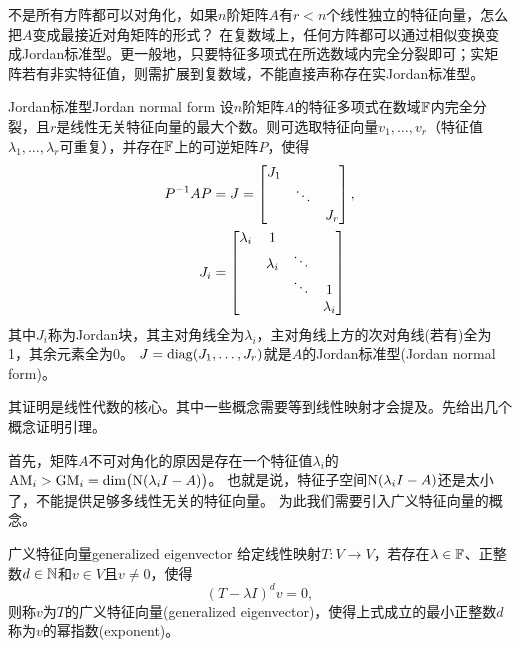 
不是所有方阵都可以对角化，如果$n$阶矩阵$A$有$r < n$个线性独立的特征向量，怎么把$A$变成最接近对角矩阵的形式？
在复数域上，任何方阵都可以通过相似变换变成Jordan标准型。更一般地，只要特征多项式在所选数域内完全分裂即可；实矩阵若有非实特征值，则需扩展到复数域，不能直接声称存在实Jordan标准型。

\begin{theorem}{Jordan标准型}{Jordan normal form}
	设$n$阶矩阵$A$的特征多项式在数域$\mathbb{F}$内完全分裂，且$r$是线性无关特征向量的最大个数。则可选取特征向量$v_1,\ldots,v_r$（特征值$\lambda_1,\ldots,\lambda_r$可重复），并存在$\mathbb{F}$上的可逆矩阵$P$，使得
	\begin{subequations}\label{eq:la-jordan-normal-form}
		\begin{align}
			P^{-1} AP &= J = \begin{bmatrix}
				J_1             \\
				 & \ddots       \\
				 &        & J_r
			\end{bmatrix},\\
			J_i &= \begin{bmatrix}
				\lambda_i & 1                              \\
				          & \lambda_i & \ddots             \\
				          &           & \ddots & 1         \\
				          &           &        & \lambda_i
			\end{bmatrix}
		\end{align}
	\end{subequations}
	其中$J_i$称为Jordan块，其主对角线全为$\lambda_i$，主对角线上方的次对角线(若有)全为1，其余元素全为0。
	$J = \operatorname{diag}(J_1,\ldots,J_r)$就是$A$的Jordan标准型(Jordan normal form)。
\end{theorem}

其证明是线性代数的核心。其中一些概念需要等到线性映射才会提及。先给出几个概念证明引理。

首先，矩阵$A$不可对角化的原因是存在一个特征值$\lambda_i$的$\mathrm{AM}_i > \mathrm{GM}_i = \dim\bigl(\operatorname{N}(\lambda_iI - A)\bigr)$。
也就是说，特征子空间$\operatorname{N}(\lambda_iI - A)$还是太小了，不能提供足够多线性无关的特征向量。
为此我们需要引入广义特征向量的概念。

\begin{definition}{广义特征向量}{generalized eigenvector}
	给定线性映射$T:V \to V$，若存在$\lambda \in \mathbb{F}$、正整数$d \in \mathbb{N}$和$v \in V$且$v \neq 0$，使得
	\begin{equation}\label{eq:la-generalized-eigenvector}
		(T - \lambda I)^dv = 0,
	\end{equation}
	则称$v$为$T$的广义特征向量(generalized eigenvector)，使得上式成立的最小正整数$d$称为$v$的幂指数(exponent)。
\end{definition}

